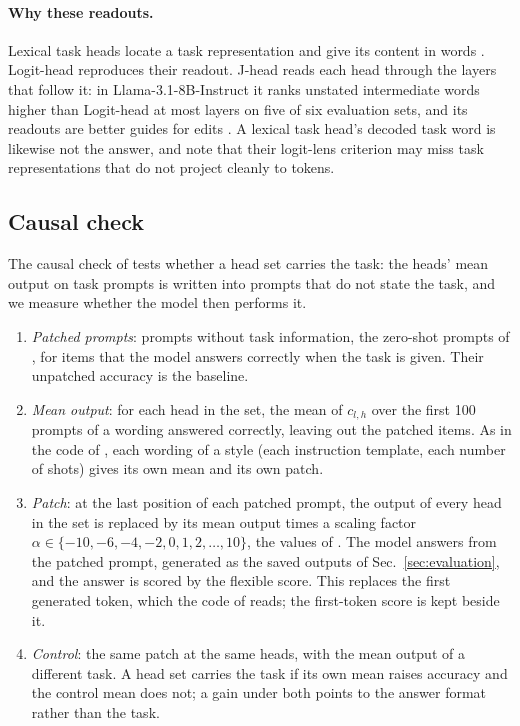 \documentclass[11pt,a4paper]{article}
\begin{document}
\paragraph{Why these readouts.} Lexical task heads locate a task representation and give its content in words \citep{yang2026shared}. Logit-head reproduces their readout. J-head reads each head through the layers that follow it: in Llama-3.1-8B-Instruct it ranks unstated intermediate words higher than Logit-head at most layers on five of six evaluation sets, and its readouts are better guides for edits \citep[Secs.~3--4]{merlo2026headjlens}. A lexical task head's decoded task word is likewise not the answer, and \citet[Sec.~4]{yang2026shared} note that their logit-lens criterion may miss task representations that do not project cleanly to tokens.

\subsection{Causal check}\label{sec:causal}
The causal check of \citet[Sec.~2.3.2, App.~G]{yang2026shared} tests whether a head set carries the task: the heads' mean output on task prompts is written into prompts that do not state the task, and we measure whether the model then performs it.
\begin{enumerate}
\item \emph{Patched prompts}: prompts without task information, the zero-shot prompts of \citet{yang2026shared}, for items that the model answers correctly when the task is given. Their unpatched accuracy is the baseline.
\item \emph{Mean output}: for each head in the set, the mean of $c_{l,h}$ over the first 100 prompts of a wording answered correctly, leaving out the patched items. As in the code of \citet{yang2026shared}, each wording of a style (each instruction template, each number of shots) gives its own mean and its own patch.
\item \emph{Patch}: at the last position of each patched prompt, the output of every head in the set is replaced by its mean output times a scaling factor $\alpha\in\{-10,-6,-4,-2,0,1,2,\dots,10\}$, the values of \citet{yang2026shared}. The model answers from the patched prompt, generated as the saved outputs of Sec.~\ref{sec:evaluation}, and the answer is scored by the flexible score. This replaces the first generated token, which the code of \citet{yang2026shared} reads; the first-token score is kept beside it.
\item \emph{Control}: the same patch at the same heads, with the mean output of a different task. A head set carries the task if its own mean raises accuracy and the control mean does not; a gain under both points to the answer format rather than the task.
\end{enumerate}
\end{document}
